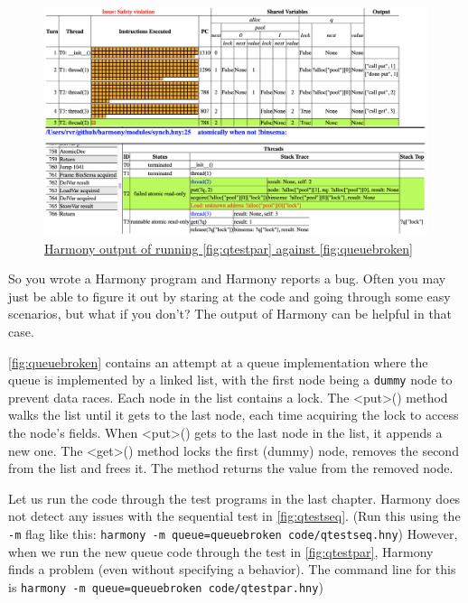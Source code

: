 \documentclass{report}
\newcommand{\harmonyref}[2]{%
\href{https://harmony.cs.cornell.edu/output/#1}{\underline{#2}}%
}
\begin{document}
\begin{figure}
\begin{center}
\includegraphics[width=\textwidth]{figures/queuebroken1.png}
\end{center}
\caption{\harmonyref{queuebug.html}{Harmony output of running
\autoref{fig:qtestpar} against \autoref{fig:queuebroken}}}
\label{fig:queuebroken1}
\end{figure}

So you wrote a Harmony program and Harmony reports a bug.
Often you may just be able to figure it out by staring at the code and
going through some easy scenarios, but what if you don't?
The output of Harmony can be helpful in that case.

\autoref{fig:queuebroken} contains an attempt at a queue implementation
where the queue is implemented by a linked list, with the first node
being a \texttt{dummy} node to prevent data races.  Each node in the
list contains a lock.  The <{put}>() method walks the list until
it gets to the last node, each time acquiring the lock to access the
node's fields.  When <{put}>() gets to the last node in the list,
it appends a new one.  The <{get}>() method locks the first (dummy)
node, removes the second from the list and frees it.  The method returns
the value from the removed node.

Let us run the code through the test programs in the last
chapter.  Harmony does not detect any issues with the sequential test
in \autoref{fig:qtestseq}.
(Run this using the \texttt{-m} flag like this:
\texttt{harmony -m queue=queuebroken code/qtestseq.hny})
However, when we run
the new queue code through the test in \autoref{fig:qtestpar}, Harmony
finds a problem (even without specifying a behavior).  The command line
for this is \texttt{harmony -m queue=queuebroken code/qtestpar.hny})
\end{document}
